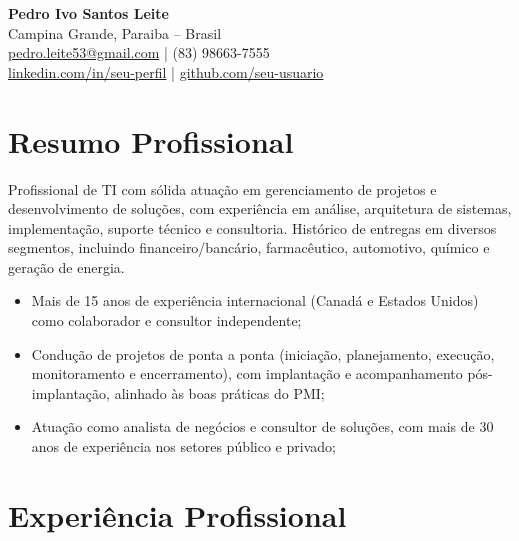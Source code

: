 \documentclass[11pt,a4paper]{article}
\begin{document}
\begin{center}
    {\LARGE \bfseries Pedro Ivo Santos Leite} \\ \vspace{4pt}
    Campina Grande, Paraiba -- Brasil \\
    \href{mailto:seu.email@email.com}{pedro.leite53@gmail.com} | (83) 98663-7555 \\
    \href{https://linkedin.com/in/seu-perfil}{linkedin.com/in/seu-perfil} | \href{https://github.com/seu-usuario}{github.com/seu-usuario}
\end{center}


\section{Resumo Profissional}
Profissional de TI com sólida atuação em gerenciamento de projetos e desenvolvimento de soluções, com experiência em análise, arquitetura de sistemas, implementação, suporte técnico e consultoria. Histórico de entregas em diversos segmentos, incluindo financeiro/bancário, farmacêutico, automotivo, químico e geração de energia.
\begin{itemize}
    \item Mais de 15 anos de experiência internacional (Canadá e Estados Unidos) como colaborador e consultor independente;
    \item Condução de projetos de ponta a ponta (iniciação, planejamento, execução, monitoramento e encerramento), com implantação e acompanhamento pós-implantação, alinhado às boas práticas do PMI;
    \item Atuação como analista de negócios e consultor de soluções, com mais de 30 anos de experiência nos setores público e privado;
\end{itemize}


\section{Experiência Profissional}
\end{document}
